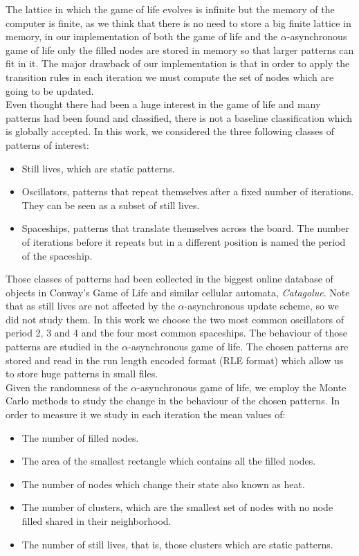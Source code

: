 \documentclass[../proyecto.tex]{book}
\begin{document}
The lattice in which the game of life evolves is infinite but the memory of the computer is finite, as we think that there is no need to store a big finite lattice in memory, in our implementation of both the game of life and the $\alpha$-asynchronous game of life only the filled nodes are stored in memory so that larger patterns can fit in it. The major drawback of our implementation is that in order to apply the transition rules in each iteration we must compute the set of nodes which are going to be updated. \\

Even thought there had been a huge interest in the game of life and many patterns had been found and classified, there is not a baseline classification which is globally accepted. In this work, we considered the three following classes of patterns of interest:

\begin{itemize}
\item Still lives, which are static patterns.
\item Oscillators, patterns that repeat themselves after a fixed number of iterations. They can be seen as a subset of still lives.
\item Spaceships, patterns that translate themselves across the board. The number of iterations before it repeats but in a different position is named the period of the spaceship.
\end{itemize}

Those classes of patterns had been collected in the biggest online database of objects in Conway's Game of Life and similar cellular automata, \textit{Catagolue}. Note that as still lives are not affected by the $\alpha$-asynchronous update scheme, so we did not study them. In this work we choose the two most common oscillators of period 2, 3 and 4 and the four most common spaceships. The behaviour of those patterns are studied in the $\alpha$-asynchronous game of life. The chosen patterns are stored and read in the run length encoded format (RLE format) which allow us to store huge patterns in small files. \\

Given the randomness of the $\alpha$-asynchronous game of life, we employ the Monte Carlo methods to study the change in the behaviour of the chosen patterns. In order to measure it we study in each iteration the mean values of:

\begin{itemize}
\item The number of filled nodes.
\item The area of the smallest rectangle which contains all the filled nodes.
\item The number of nodes which change their state also known as heat.
\item The number of clusters, which are the smallest set of nodes with no node filled shared in their neighborhood.
\item The number of still lives, that is, those clusters which are static patterns.
\end{itemize}
\end{document}
